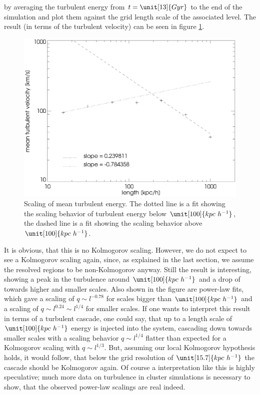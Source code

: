 by averaging the turbulent energy from $t=\unit[13]{Gyr}$ to the end of the
simulation and plot them against the grid length scale of the associated level.
The result (in terms of the turbulent velocity) can be seen in figure 
\ref{fig:tuefitcluster}. 
\begin{figure}[tp]
\centering
\includegraphics[width=0.7\linewidth]{chapter9/tuemwfitcluster128.eps}
\caption{Scaling of mean turbulent energy. The dotted line is a fit showing the
scaling behavior of turbulent energy below $\unit[100]{kpc\ h^{-1}}$, the dashed
line is a fit showing the scaling behavior above $\unit[100]{kpc\ h^{-1}}$.}
\label{fig:tuefitcluster}
\end{figure}
It is obvious, that this is no Kolmogorov scaling. However, we do not expect to
see a Kolmogorov scaling again, since, as explained in the last section, we
assume the resolved regions to be non-Kolmogorov anyway. Still the result is
interesting, showing a peak in the turbulence around $\unit[100]{kpc\ h^{-1}}$
and a drop of towards higher and smaller scales. Also shown in the figure are
power-law fits, which gave a scaling of $q \sim l^{-0.78}$ for scales bigger
than $\unit[100]{kpc\ h^{-1}}$ and a scaling of $q \sim l^{0.24} \sim l^{1/4}$
for smaller scales. If one wants to interpret this result in terms of a
turbulent cascade, one could say, that up to a length scale of  
$\unit[100]{kpc\ h^{-1}}$ energy is injected into the system, cascading down
towards smaller scales with a scaling behavior $q \sim l^{1/4}$ flatter than
expected for a Kolmogorov scaling with $q \sim l^{1/3}$. But, assuming our local
Kolmogorov hypothesis holds, it would follow, that below the grid resolution
of $\unit[15.7]{kpc\ h^{-1}}$ the cascade should be Kolmogorov again. Of course
a interpretation like this is highly speculative; much more data on
turbulence in cluster simulations is necessary to show, that the
observed power-law scalings are real indeed.

